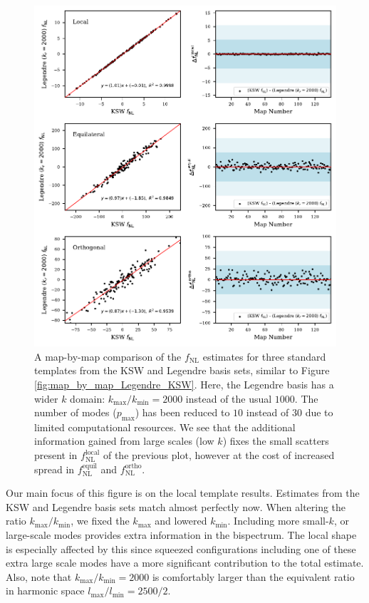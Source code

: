 \begin{figure}[htbp!] 
	\centering    
	\includegraphics{map_by_map_Legendre_KSW_k_ratio_2000.pdf}
	\caption{A map-by-map comparison of the $f_\text{NL}$ estimates for three standard templates from the KSW and Legendre basis sets, similar to Figure \ref{fig:map_by_map_Legendre_KSW}. Here, the Legendre basis has a wider $k$ domain: $k_\text{max}/k_\text{min} = 2000$ instead of the usual $1000$. The number of modes ($p_\text{max}$) has been reduced to $10$ instead of $30$ due to limited computational resources. We see that the additional information gained from large scales (low $k$) fixes the small scatters present in $f_\text{NL}^\textrm{local}$ of the previous plot, however at the cost of increased spread in $f_\text{NL}^\textrm{equil}$ and $f_\text{NL}^\textrm{ortho}$.}
	\label{fig:map_by_map_Legendre_KSW_k_ratio_2000}
\end{figure}

Our main focus of this figure is on the local template results. Estimates from the KSW and Legendre basis sets match almost perfectly now. When altering the ratio $k_\text{max}/k_\text{min}$, we fixed the $k_\text{max}$ and lowered $k_\text{min}$. Including more small-$k$, or large-scale modes provides extra information in the bispectrum. The local shape is especially affected by this since squeezed configurations including one of these extra large scale modes have a more significant contribution to the total estimate. Also, note that $k_\text{max} / k_\text{min} = 2000$ is comfortably larger than the equivalent ratio in harmonic space $l_\text{max} / l_\text{min} = 2500 / 2$.

